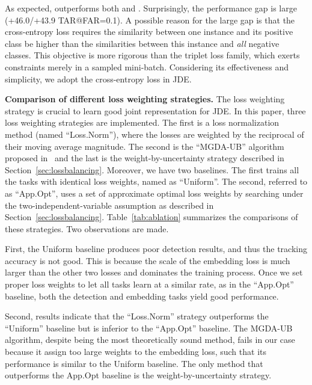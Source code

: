 \documentclass[runningheads]{llncs}
\begin{document}
As expected,  outperforms both  and . Surprisingly, the performance gap is large (+46.0/+43.9 TAR@FAR=0.1). A possible reason for the large gap is that the cross-entropy loss requires the similarity between one instance and its positive class be higher than the similarities between this instance and \emph{all}  negative classes. This objective is more rigorous than the triplet loss family, which exerts constraints merely in a sampled mini-batch. Considering its effectiveness and simplicity, we adopt the cross-entropy loss in JDE. 





\textbf{Comparison of different loss weighting strategies.}
The loss weighting strategy is crucial to learn good joint representation for JDE.
In this paper, three loss weighting strategies are implemented. The first is a loss normalization method (named ``Loss.Norm''), where the losses are weighted by the reciprocal of their moving average magnitude. The second is the ``MGDA-UB'' algorithm proposed in~\cite{MGDA} and the last is the weight-by-uncertainty strategy described in Section~\ref{sec:lossbalancing}.
Moreover, we have two baselines. The first trains all the tasks with identical loss weights, named as ``Uniform''. The second, referred to as ``App.Opt'', uses a set of approximate optimal loss weights by searching under the two-independent-variable assumption as described in Section~\ref{sec:lossbalancing}. Table~\ref{tab:ablation} summarizes the comparisons of these strategies. Two observations are made. 

First, the Uniform baseline produces poor detection results, and thus the tracking accuracy is not good. This is because the scale of the embedding loss is much larger than the other two losses and dominates the training process. Once we set proper loss weights to let all tasks learn at a similar rate, as in the ``App.Opt'' baseline, both the detection and embedding tasks yield good performance. 

Second, 
results indicate that the ``Loss.Norm'' strategy outperforms the ``Uniform'' baseline but is inferior to the ``App.Opt'' baseline. The MGDA-UB algorithm, despite being the most theoretically sound method, fails in our case because it assign too large weights to the embedding loss, such that its performance is similar to the Uniform baseline. The only method that outperforms the App.Opt baseline is the weight-by-uncertainty strategy. 
\end{document}
